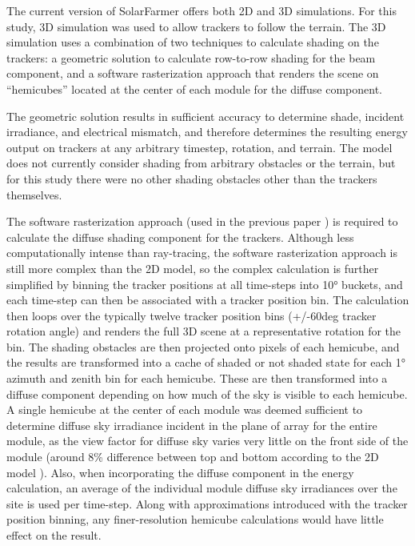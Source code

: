 \documentclass[conference]{IEEEtran}
\begin{document}
The current version of SolarFarmer offers both 2D and 3D simulations. For this study, 3D simulation was used to allow trackers to follow the terrain. The 3D simulation uses a combination of two techniques to calculate shading on the trackers: a geometric solution to calculate row-to-row shading for the beam component, and a software rasterization approach that renders the scene on “hemicubes” located at the center of each module for the diffuse component. 

The geometric solution results in sufficient accuracy to determine shade, incident irradiance, and electrical mismatch, and therefore determines the resulting energy output on trackers at any arbitrary timestep, rotation, and terrain. The model does not currently consider shading from arbitrary obstacles or the terrain, but for this study there were no other shading obstacles other than the trackers themselves.

The software rasterization approach (used in the previous paper \cite{Mikofski_9300381}) is required to calculate the diffuse shading component for the trackers. Although less computationally intense than ray-tracing, the software rasterization approach is still more complex than the 2D model, so the complex calculation is further simplified by binning the tracker positions at all time-steps into 10° buckets, and each time-step can then be associated with a tracker position bin. The calculation then loops over the typically twelve tracker position bins (+/-60deg tracker rotation angle) and renders the full 3D scene at a representative rotation for the bin. The shading obstacles are then projected onto pixels of each hemicube, and the results are transformed into a cache of shaded or not shaded state for each 1° azimuth and zenith bin for each hemicube. These are then transformed into a diffuse component depending on how much of the sky is visible to each hemicube. A single hemicube at the center of each module was deemed sufficient to determine diffuse sky irradiance incident in the plane of array for the entire module, as the view factor for diffuse sky varies very little on the front side of the module (around 8\% difference between top and bottom according to the 2D model \cite{Mikofski_8980572}). Also, when incorporating the diffuse component in the energy calculation, an average of the individual module diffuse sky irradiances over the site is used per time-step. Along with approximations introduced with the tracker position binning, any finer-resolution hemicube calculations would have little effect on the result.
\end{document}

